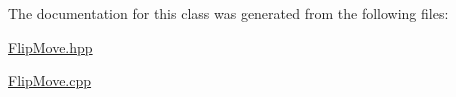 The documentation for this class was generated from the following files\-:\begin{DoxyCompactItemize}
\item 
\hyperlink{_flip_move_8hpp}{Flip\-Move.\-hpp}\item 
\hyperlink{_flip_move_8cpp}{Flip\-Move.\-cpp}\end{DoxyCompactItemize}
